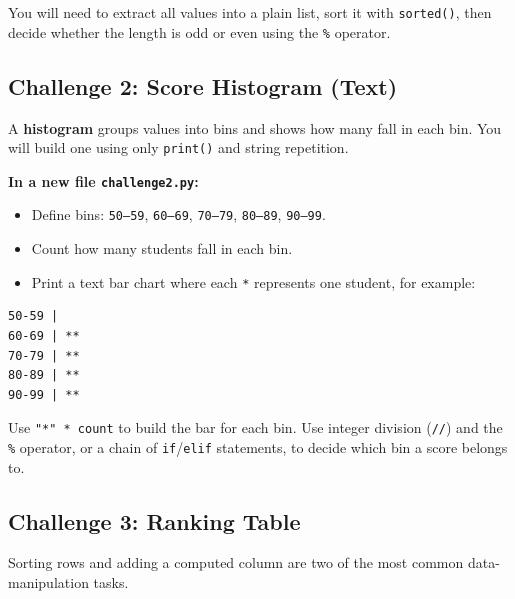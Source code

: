\documentclass{cslab}
\begin{document}
\begin{hint}
You will need to extract all values into a plain list, sort it with \texttt{sorted()}, then decide whether the length is odd or even using the \texttt{\%} operator.
\end{hint}

\subsection*{Challenge 2: Score Histogram (Text)}

A \textbf{histogram} groups values into bins and shows how many fall in each bin. You will build one using only \texttt{print()} and string repetition.

\textbf{In a new file \texttt{challenge2.py}:}
\begin{itemize}
    \item Define bins: \texttt{50--59}, \texttt{60--69}, \texttt{70--79}, \texttt{80--89}, \texttt{90--99}.
    \item Count how many students fall in each bin.
    \item Print a text bar chart where each \texttt{*} represents one student, for example:
\end{itemize}

\begin{lstlisting}[language={},numbers=none]
50-59 |
60-69 | **
70-79 | **
80-89 | **
90-99 | **
\end{lstlisting}

\begin{hint}
Use \texttt{"*" * count} to build the bar for each bin. Use integer division (\texttt{//}) and the \texttt{\%} operator, or a chain of \texttt{if}/\texttt{elif} statements, to decide which bin a score belongs to.
\end{hint}

\subsection*{Challenge 3: Ranking Table}

Sorting rows and adding a computed column are two of the most common data-manipulation tasks.
\end{document}
